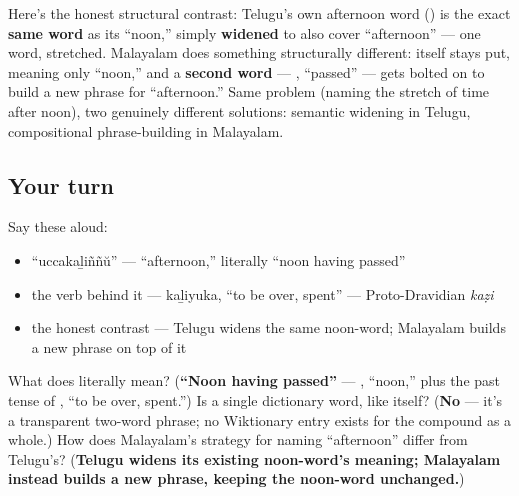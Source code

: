 \begin{culture}
Here's the honest structural contrast: Telugu's own afternoon word (\textbf{}) is the exact \textbf{same word} as its \textquotedblleft{}noon,\textquotedblright{} simply \textbf{widened} to also cover \textquotedblleft{}afternoon\textquotedblright{} — one word, stretched. Malayalam does something structurally different: \textbf{} itself stays put, meaning only \textquotedblleft{}noon,\textquotedblright{} and a \textbf{second word} — , \textquotedblleft{}passed\textquotedblright{} — gets bolted on to build a new phrase for \textquotedblleft{}afternoon.\textquotedblright{} Same problem (naming the stretch of time after noon), two genuinely different solutions: semantic widening in Telugu, compositional phrase-building in Malayalam.
\end{culture}

\subsection*{Your turn}
Say these aloud:

\begin{itemize}
\raggedright
  \item \textquotedblleft{}uccakaḻiññŭ\textquotedblright{} — \textquotedblleft{}afternoon,\textquotedblright{} literally \textquotedblleft{}noon having passed\textquotedblright{}
  \item the verb behind it — kaḻiyuka, \textquotedblleft{}to be over, spent\textquotedblright{} — Proto-Dravidian \emph{kaẓi}
  \item the honest contrast — Telugu widens the same noon-word; Malayalam builds a new phrase on top of it
\end{itemize}

\begin{tcolorbox}[breakable,colback=teal!4,colframe=teal!35!black,title={Before you move on}]
What does  literally mean? (\textbf{\textquotedblleft{}Noon having passed\textquotedblright{}} — , \textquotedblleft{}noon,\textquotedblright{} plus the past tense of \textbf{}, \textquotedblleft{}to be over, spent.\textquotedblright{}) Is  a single dictionary word, like  itself? (\textbf{No} — it's a transparent two-word phrase; no Wiktionary entry exists for the compound as a whole.) How does Malayalam's strategy for naming \textquotedblleft{}afternoon\textquotedblright{} differ from Telugu's? (\textbf{Telugu widens its existing noon-word's meaning; Malayalam instead builds a new phrase, keeping the noon-word unchanged.})
\end{tcolorbox}
